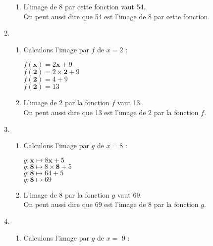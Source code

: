 \begin{corrige}
\begin{enumerate}
\begin{enumerate}
        \item L'image de 8 par cette fonction vaut 54.\\
    On peut aussi dire que 54 est l'image de 8 par cette fonction.
    \end{enumerate}
    \setcounter{enumi}{1}
        \item 
        \begin{enumerate}
        \item Calculons l'image par $f$ de $x= 2$ :
        \begin{multicols}{2}    
            $f({\boldsymbol{x}})= 2 {\boldsymbol{x}}+9$\\
            $f({\boldsymbol{2}})= 2\times {\boldsymbol{2}}+9$\\
            $f({\boldsymbol{2}})= 4+9$\\
            $f({\boldsymbol{2}})= 13$
        \end{multicols}
        \item L'image de 2 par la fonction $f$ vaut 13.
    \\
     On peut aussi dire que 13 est l'image de 2 par la fonction $f$.
    \end{enumerate}
    \setcounter{enumi}{2}
        \item \begin{enumerate}
        \item Calculons l'image par $g$ de $x= 8$ :
        \begin{multicols}{2}    
            $g:{\boldsymbol{x}}\longmapsto 8 {\boldsymbol{x}}+5$\\
            $g:{\boldsymbol{8}}\longmapsto 8\times {\boldsymbol{8}}+5$\\
            $g:{\boldsymbol{8}}\longmapsto 64+5$\\
            $g:{\boldsymbol{8}}\longmapsto 69$
        \end{multicols}
        \item L'image de 8 par la fonction $g$ vaut 69.
    \\
     On peut aussi dire que 69 est l'image de 8 par la fonction $g$.
    \end{enumerate}
    \setcounter{enumi}{3}
        \item 
        \begin{enumerate}
        \item Calculons l'image par $g$ de $x=$ 9 :\\
        \hspace*{-15mm}
        \scalebox{0.8}{
        \begin{tikzpicture}[line cap=round,line join=round,>=triangle 45,x=1cm,y=1cm]

\end{tikzpicture}}
\end{enumerate}
\end{enumerate}
\end{corrige}
